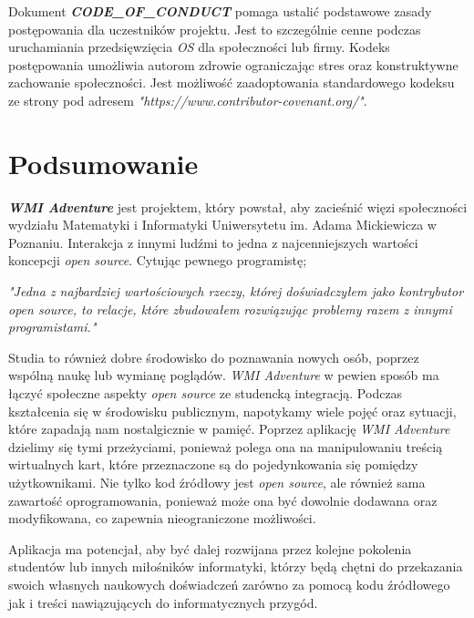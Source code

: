 \documentclass{article}
\begin{document}
\hspace{4mm} Dokument \textbf{\emph{CODE\_OF\_CONDUCT}} pomaga ustalić podstawowe zasady postępowania dla uczestników projektu. Jest to szczególnie cenne podczas uruchamiania przedsięwzięcia \emph{OS} dla społeczności lub firmy. Kodeks postępowania umożliwia autorom zdrowie ograniczając stres oraz konstruktywne zachowanie społeczności\cite{opensource.guide}. Jest możliwość zaadoptowania standardowego kodeksu ze strony pod adresem \emph{"https://www.contributor-covenant.org/"}\cite{contributor.covenant}.

\section{Podsumowanie}

\hspace{4mm} \textbf{\emph{WMI Adventure}} jest projektem, który powstał, aby zacieśnić więzi społeczności wydziału Matematyki i Informatyki Uniwersytetu im. Adama Mickiewicza w Poznaniu. Interakcja z innymi ludźmi to jedna z najcenniejszych wartości koncepcji \emph{open source}. Cytując pewnego programistę; 

\begin{displayquote} 
    \emph{"Jedna z najbardziej wartościowych rzeczy, której doświadczyłem jako kontrybutor open source, to relacje, które zbudowałem rozwiązując problemy razem z innymi programistami\cite{kentcdodds}."}
\end{displayquote} 

Studia to również dobre środowisko do poznawania nowych osób, poprzez wspólną naukę lub wymianę poglądów. \emph{WMI Adventure} w pewien sposób ma łączyć społeczne aspekty \emph{open source} ze studencką integracją. Podczas kształcenia się w środowisku publicznym, napotykamy wiele pojęć oraz sytuacji, które zapadają nam nostalgicznie w pamięć. Poprzez aplikację \emph{WMI Adventure} dzielimy się tymi przeżyciami, ponieważ polega ona na manipulowaniu treścią wirtualnych kart, które przeznaczone są do pojedynkowania się pomiędzy użytkownikami. Nie tylko kod źródłowy jest \emph{open source}, ale również sama zawartość oprogramowania, ponieważ może ona być dowolnie dodawana oraz modyfikowana, co zapewnia nieograniczone możliwości.

Aplikacja ma potencjał, aby być dalej rozwijana przez kolejne pokolenia studentów lub innych miłośników informatyki, którzy będą chętni do przekazania swoich własnych naukowych doświadczeń zarówno za pomocą kodu źródłowego jak i treści nawiązujących do informatycznych przygód.
\end{document}
